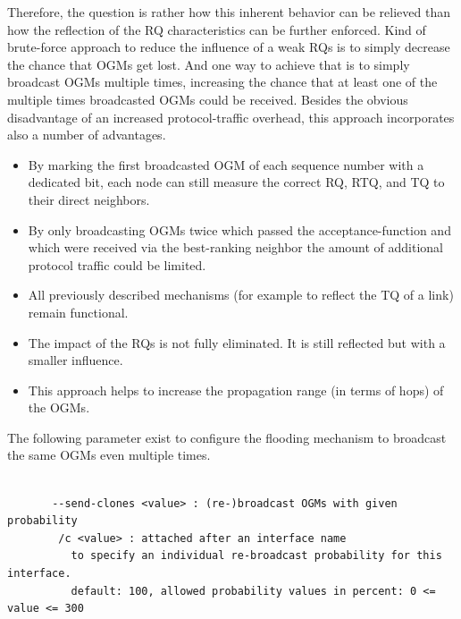 \documentclass[11pt]{article}
\begin{document}
%
%
%
%
Therefore, the question is rather how this inherent behavior can be relieved than how the reflection of the RQ characteristics can be further enforced.
%
Kind of brute-force approach to reduce the influence of a weak RQs is to simply decrease the chance that OGMs get lost.
%
And one way to achieve that is to simply broadcast OGMs multiple times, increasing the chance that at least one of the multiple times broadcasted OGMs could be received.
%
Besides the obvious disadvantage of an increased protocol-traffic overhead, this approach incorporates also a number of advantages.

\begin{itemize}

 \item By marking the first broadcasted OGM of each sequence number with a dedicated bit, each node can still measure the correct RQ, RTQ, and TQ to their direct neighbors.

 \item By only broadcasting OGMs twice which passed the acceptance-function and which were received via the best-ranking neighbor the amount of additional protocol traffic could be limited.

 \item All previously described mechanisms (for example to reflect the TQ of a link) remain functional.

 \item The impact of the RQs is not fully eliminated. It is still reflected but with a smaller influence.

 \item This approach helps to increase the propagation range (in terms of hops) of the OGMs.

\end{itemize}

The following parameter exist to configure the flooding mechanism to broadcast the same OGMs even multiple times.
%

\begin{small}
\begin{verbatim}

       --send-clones <value> : (re-)broadcast OGMs with given probability
        /c <value> : attached after an interface name
          to specify an individual re-broadcast probability for this interface.
          default: 100, allowed probability values in percent: 0 <= value <= 300

\end{verbatim}
\end{small}
\end{document}
